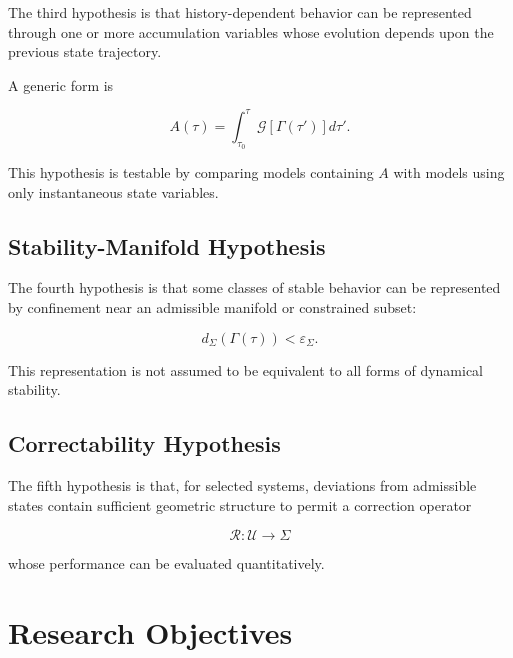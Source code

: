 \documentclass[12pt,oneside]{book}
\newcommand{\Corr}{\mathcal{R}}
\begin{document}
The third hypothesis is that history-dependent behavior can be
represented through one or more accumulation variables whose
evolution depends upon the previous state trajectory.

A generic form is

\begin{equation}
    A(\tau)
    =
    \int_{\tau_0}^{\tau}
        \mathcal{G}
        [\Gamma(\tau')]
    d\tau'.
    \label{eq:accumulation-hypothesis}
\end{equation}

This hypothesis is testable by comparing models containing
\(A\) with models using only instantaneous state variables.

\subsection{Stability-Manifold Hypothesis}

The fourth hypothesis is that some classes of stable behavior
can be represented by confinement near an admissible manifold
or constrained subset:

\begin{equation}
    d_{\Sigma}
    \left(
        \Gamma(\tau)
    \right)
    <
    \varepsilon_{\Sigma}.
    \label{eq:stability-manifold-hypothesis}
\end{equation}

This representation is not assumed to be equivalent to all
forms of dynamical stability.

\subsection{Correctability Hypothesis}

The fifth hypothesis is that, for selected systems, deviations
from admissible states contain sufficient geometric structure
to permit a correction operator

\begin{equation}
    \Corr:
    \mathcal{U}
    \rightarrow
    \Sigma
\end{equation}

whose performance can be evaluated quantitatively.


\section{Research Objectives}
\label{sec:research-objectives}
\end{document}
